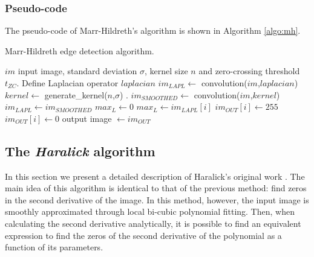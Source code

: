 \documentclass{ipol}
\numberwithin{equation}{section}
\numberwithin{table}{section}
\begin{document}
\subsubsection{Pseudo-code}

The pseudo-code of Marr-Hildreth's algorithm is shown in Algorithm \ref{algo:mh}.

\begin{algorithm}[t!]
\caption{Marr-Hildreth edge detection algorithm.}
\label{algo:mh}
\begin{algorithmic}[1]
\REQUIRE $im$ input image, standard deviation $\sigma$, kernel size $n$ and zero-crossing threshold $t_{ZC}$.
	\STATE Define Laplacian operator $laplacian$
	\STATE $im_{LAPL} \leftarrow$ convolution($im$,$laplacian$)
\ELSE
	\STATE $kernel \leftarrow$ generate\_kernel($n$,$\sigma$) .
	\STATE $im_{SMOOTHED} \leftarrow$ convolution($im$,$kernel$)
	\STATE $im_{LAPL} \leftarrow im_{SMOOTHED}$
\ENDIF
\STATE $max_L \leftarrow 0$
		\STATE $max_L \leftarrow im_{LAPL}[i]$
	\ENDIF
\ENDFOR
{}
			\STATE $im_{OUT}[i] \leftarrow 255$
		\ELSE
			\STATE $im_{OUT}[i] \leftarrow 0$
		\ENDIF
	\ENDFOR
\ENDFOR
\RETURN output image $\leftarrow im_{OUT}$
\end{algorithmic}
\end{algorithm}


\subsection{The \textit{Haralick} algorithm}

In this section we present a detailed description of Haralick's original work \cite{bb20239}.
The main idea of this algorithm is identical to that of the previous method: find zeros in 
the second derivative of the image. In this method, however, the input image is smoothly approximated through local bi-cubic
polynomial fitting. Then, when calculating the second derivative analytically, it is possible to find 
an equivalent expression to find the zeros of the second derivative of the polynomial as a function of 
its parameters.%
\end{document}
